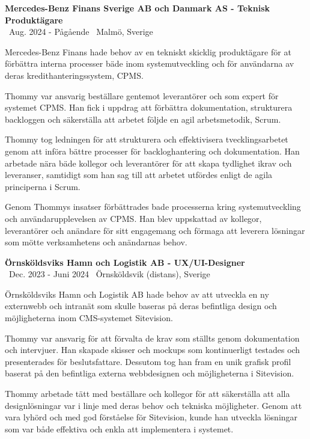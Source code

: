 \documentclass[a4paper,10pt]{article}
\begin{document}
\textbf{Mercedes-Benz Finans Sverige AB och Danmark AS - Teknisk Produktägare}\\
\normalsize \faCalendar \ Aug. 2024 - Pågående \quad \faMapMarker \ Malmö, Sverige

Mercedes-Benz Finans hade behov av en tekniskt skicklig produktägare för at förbättra interna processer bäde inom systemutveckling och för användarna av deras kredithanteringssystem, CPMS.

Thommy var ansvarig beställare gentemot leverantörer och som expert för systemet CPMS. Han fick i uppdrag att förbättra dokumentation, strukturera backloggen och säkerställa att arbetet följde en agil arbetsmetodik, Scrum.

Thommy tog ledningen för att strukturera och effektivisera tvecklingsarbetet genom att införa bättre processer för backloghantering och dokumentation. Han arbetade nära bäde kollegor och leverantörer för att skapa tydlighet ikrav och leveranser, samtidigt som han sag till att arbetet utfördes enligt de agila principerna i Scrum.

Genom Thommys insatser förbättrades bade processerna kring systemutveckling och användarupplevelsen av CPMS. Han blev uppskattad av kollegor, leverantörer och anändare för sitt engagemang och förmaga att leverera lösningar som mötte verksamhetens och anändarnas behov.

\vspace{0.5cm}
\textbf{Örnsköldsviks Hamn och Logistik AB - UX/UI-Designer}\\
\normalsize \faCalendar \ Dec. 2023 - Juni 2024 \quad \faMapMarker \ Örnsköldsvik (distans), Sverige

Örnsköldsviks Hamn och Logistik AB hade behov av att utveckla en ny externwebb och intranät som skulle baseras på deras befintliga design och möjligheterna inom CMS-systemet Sitevision.

Thommy var ansvarig för att förvalta de krav som ställts genom dokumentation och intervjuer. Han skapade skisser och mockups som kontinuerligt testades och presenterades för beslutsfattare. Dessutom tog han fram en unik grafisk profil baserat på den befintliga externa webbdesignen och möjligheterna i Sitevision.

Thommy arbetade tätt med beställare och kollegor för att säkerställa att alla designlösningar var i linje med deras behov och tekniska möjligheter. Genom att vara lyhörd och med god förståelse för Sitevision, kunde han utveckla lösningar som var både effektiva och enkla att implementera i systemet.
\end{document}
